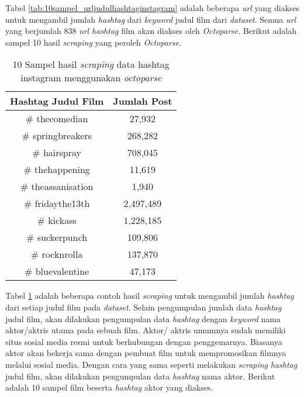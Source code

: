 Tabel \ref{tab:10sampel_urljudulhashtaginstagram} adalah beberapa \textit{url} yang diakses untuk mengambil jumlah \textit{hashtag} dari \textit{keyword} judul film dari \textit{dataset}. Semua \textit{url} yang berjumlah 838 \textit{url hashtag} film akan diakses oleh \textit{Octoparse}. Berikut adalah sampel 10 hasil \textit{scraping} yang peroleh \textit{Octoparse}. 

\begin{table}[H]
\centering
\caption{10 Sampel hasil \textit{scraping } data hashtag instagram  menggunakan \textit{octoparse}}
\begin{tabular}{|c|c|}
  \hline 
  Hashtag Judul Film & Jumlah Post \\ 
  \hline 
  \# thecomedian & 27,932 \\ 
  \hline 
  \# springbreakers & 268,282 \\ 
  \hline 
  \# hairspray & 708,045 \\ 
  \hline 
  \# thehappening & 11,619 \\ 
  \hline 
  \# theassanisation & 1,940 \\ 
  \hline 
  \# fridaythe13th & 2,497,489 \\ 
  \hline 
  \# kickass & 1,228,185 \\ 
  \hline 
  \# suckerpunch & 109,806 \\ 
  \hline 
  \# rocknrolla & 137,870 \\ 
  \hline 
  \# bluevalentine & 47,173 \\ 
  \hline 
  \end{tabular}   

\label{tab:10sampel_hasilscrapjudulinstagram}
\end{table}

Tabel \ref{tab:10sampel_hasilscrapjudulinstagram} adalah beberapa contoh hasil \textit{scraping} untuk mengambil jumlah \textit{hashtag} dari setiap judul film pada \textit{dataset}. Selain pengumpulan jumlah data \textit{hashtag} judul film, akan dilakukan pengumpulan data \textit{hashtag}  dengan \textit{keyword} nama aktor/aktris utama pada sebuah film. Aktor/ aktris umumnya sudah memiliki situs sosial media resmi untuk berhubungan dengan penggemarnya. Biasanya aktor akan bekerja sama dengan pembuat film untuk mempromosikan filmnya melalui sosial media. Dengan cara yang sama seperti melakukan \textit{scraping} \textit{hashtag} judul film, akan dilakukan pengumpulan data \textit{hashtag} nama aktor. Berikut adalah 10 sampel film beserta \textit{hashtag} aktor yang diakses. 

